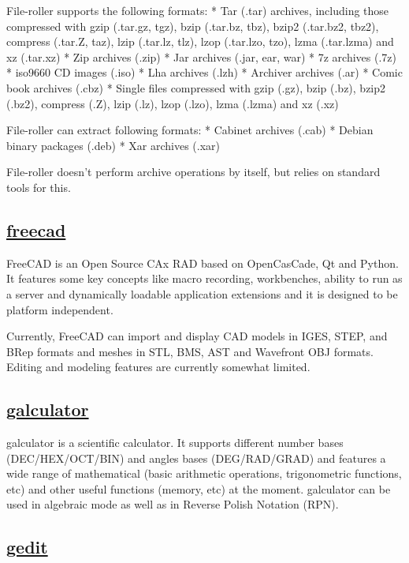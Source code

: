 File-roller supports the following formats:
  * Tar (.tar) archives, including those compressed with
    gzip (.tar.gz, tgz), bzip (.tar.bz, tbz), bzip2 (.tar.bz2, tbz2),
    compress (.tar.Z, taz), lzip (.tar.lz, tlz), lzop (.tar.lzo, tzo),
    lzma (.tar.lzma) and xz (.tar.xz)
  * Zip archives (.zip)
  * Jar archives (.jar, ear, war)
  * 7z archives (.7z)
  * iso9660 CD images (.iso)
  * Lha archives (.lzh)
  * Archiver archives (.ar)
  * Comic book archives (.cbz)
  * Single files compressed with gzip (.gz), bzip (.bz), bzip2 (.bz2),
    compress (.Z), lzip (.lz), lzop (.lzo), lzma (.lzma) and xz (.xz)
 
 File-roller can extract following formats:
  * Cabinet archives (.cab)
  * Debian binary packages (.deb)
  * Xar archives (.xar)
 
 File-roller doesn't perform archive operations by itself, but relies on
 standard tools for this.

\subsection{\href{http://freecadweb.org/}{freecad}}

 FreeCAD is an Open Source CAx RAD based on OpenCasCade, Qt and Python.
 It features some key concepts like macro recording, workbenches, ability
 to run as a server and dynamically loadable application extensions and
 it is designed to be platform independent.
 
 Currently, FreeCAD can import and display CAD models in IGES, STEP, and
 BRep formats and meshes in STL, BMS, AST and Wavefront OBJ formats.
 Editing and modeling features are currently somewhat limited.

\subsection{\href{http://galculator.sourceforge.net/}{galculator}}

 galculator is a scientific calculator. It supports different number
 bases (DEC/HEX/OCT/BIN) and angles bases (DEG/RAD/GRAD) and features a
 wide range of mathematical (basic arithmetic operations, trigonometric
 functions, etc) and other useful functions (memory, etc) at the moment.
 galculator can be used in algebraic mode as well as in Reverse Polish
 Notation (RPN).

\subsection{\href{https://wiki.gnome.org/Apps/Gedit}{gedit}}

